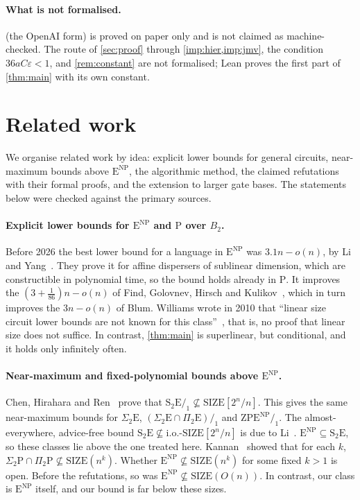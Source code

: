 \documentclass[10pt]{amsart}
\theoremstyle{plain}
\theoremstyle{definition}
\theoremstyle{remark}
\numberwithin{equation}{section}
\newcommand{\ENP}{\mathrm{E}^{\mathrm{NP}}}
\newcommand{\SIZE}{\mathrm{SIZE}}
\begin{document}
\paragraph{What is not formalised.}  (the OpenAI form) is proved on paper only and
is not claimed as machine-checked. The route of \cref{sec:proof} through \cref{imp:hier,imp:jmv}, the
condition $36aC\varepsilon<1$, and \cref{rem:constant} are not formalised; Lean proves the first part
of \cref{thm:main} with its own constant.

\section{Related work}\label{sec:known}

We organise related work by idea: explicit lower bounds for general circuits, near-maximum bounds
above $\ENP$, the algorithmic method, the claimed refutations with their formal proofs, and the
extension to larger gate bases. The statements below were checked against the primary sources.

\paragraph{Explicit lower bounds for $\ENP$ and $\mathrm{P}$ over $B_2$.} Before 2026 the best
lower bound for a language in $\ENP$ was $3.1n-o(n)$, by Li and Yang~\cite{LY22}. They prove it for
affine dispersers of sublinear dimension, which are constructible in polynomial time, so the bound
holds already in $\mathrm{P}$. It improves the $(3+\tfrac1{86})n-o(n)$ of Find, Golovnev, Hirsch and
Kulikov~\cite{FGHK16}, which in turn improves the $3n-o(n)$ of Blum. Williams wrote in 2010 that
``linear size circuit lower bounds are not known for this class''~\cite{Wil13}, that is, no proof
that linear size does not suffice. In contrast, \cref{thm:main} is superlinear, but conditional,
and it holds only infinitely often.

\paragraph{Near-maximum and fixed-polynomial bounds above $\ENP$.} Chen, Hirahara and
Ren~\cite{CHR24} prove that $\mathrm{S}_2\mathrm{E}/_1\not\subseteq\SIZE[2^n/n]$. This gives the
same near-maximum bounds for $\Sigma_2\mathrm{E}$, $(\Sigma_2\mathrm{E}\cap\Pi_2\mathrm{E})/_1$ and
$\mathrm{ZPE}^{\mathrm{NP}}/_1$. The almost-everywhere, advice-free bound
$\mathrm{S}_2\mathrm{E}\not\subseteq\text{i.o.-}\SIZE[2^n/n]$ is due to Li~\cite{Li24}.
$\ENP\subseteq\mathrm{S}_2\mathrm{E}$, so these classes lie above the one treated here.
Kannan~\cite{Kannan82} showed that for each $k$,
$\Sigma_2\mathrm{P}\cap\Pi_2\mathrm{P}\not\subseteq\SIZE(n^k)$. Whether $\ENP\not\subseteq\SIZE(n^k)$
for some fixed $k>1$ is open. Before the refutations, so was $\ENP\not\subseteq\SIZE(O(n))$. In
contrast, our class is $\ENP$ itself, and our bound is far below these sizes.
\end{document}
